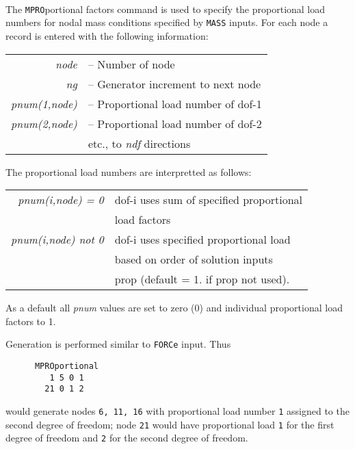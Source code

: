  \\{\smallskip}
 \\{\smallskip}
 \\{\smallskip}
\headb

The {\tt MPRO}portional factors command is used to specify the proportional
load numbers for nodal mass conditions specified by {\tt MASS} inputs.
For each node a record is entered with the following information:

\begin{center}
\begin{tabular}{r l}
\it node         &-- Number of node \\
\it ng           &-- Generator increment to next node \\
\it pnum(1,node) &-- Proportional load number of dof-1 \\
\it pnum(2,node) &-- Proportional load number of dof-2 \\
                 &\quad etc., to {\it ndf} directions \\
\end{tabular}
\end{center}
The proportional load numbers are interpretted as follows:

\begin{center}
\begin{tabular}{r l}
\it pnum(i,node)  =  0  & dof-i uses sum of specified proportional \\
                        & load factors \\
\it pnum(i,node) not 0  & dof-i uses specified proportional load \\
                        & based on order of solution inputs \\
                        & prop (default = 1. if prop not used). \\
\end{tabular}
\end{center}
As a default all {\it pnum} values are set to zero (0) and individual
proportional load factors to 1.

Generation is performed similar to {\tt FORCe} input.  Thus
\begin{verbatim}
      MPROportional
         1 5 0 1
        21 0 1 2

\end{verbatim}
would generate nodes {\tt 6, 11, 16} with proportional load number {\tt 1}
assigned to the second degree of freedom; node {\tt 21} would have
proportional load {\tt 1} for the first degree of freedom and {\tt 2} for
the second degree of freedom.

